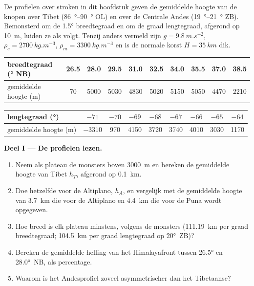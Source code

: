 \begin{problem}\label{pb:b2:himalaya-andes:1}
De profielen over stroken in dit hoofdstuk geven de gemiddelde hoogte van de knopen over Tibet
(\qtyrange{86}{90}{\degree} OL) en over de Centrale Andes (\qtyrange{19}{21}{\degree} ZB).
Bemonsterd om de \ang{1.5} breedtegraad en om de graad lengtegraad, afgerond op \qty{10}{m}, luiden ze
als volgt. Tenzij anders vermeld zijn $g = \qty{9.8}{m.s^{-2}}$, $\rho_c = \qty{2700}{kg.m^{-3}}$,
$\rho_m = \qty{3300}{kg.m^{-3}}$ en is de normale korst $H = \qty{35}{km}$ dik.

\smallskip
\begin{center}\small
\begin{tabular}{l|ccccccccc}
breedtegraad (\unit{\degree} NB) & 26.5 & 28.0 & 29.5 & 31.0 & 32.5 & 34.0 & 35.5 & 37.0 & 38.5 \\ \hline
gemiddelde hoogte (\unit{m}) & 70 & 5000 & 5030 & 4830 & 5020 & 5150 & 5050 & 4470 & 2210
\end{tabular}

\smallskip
\begin{tabular}{l|cccccccc}
lengtegraad (\unit{\degree}) & $-71$ & $-70$ & $-69$ & $-68$ & $-67$ & $-66$ & $-65$ & $-64$ \\ \hline
gemiddelde hoogte (\unit{m}) & $-3310$ & 970 & 4150 & 3720 & 3740 & 4010 & 3030 & 1170
\end{tabular}
\end{center}
\smallskip

\noindent\textbf{Deel I --- De profielen lezen.}
\begin{enumerate}
\item Neem als plateau de monsters boven \qty{3000}{m} en bereken de gemiddelde hoogte van Tibet
$h_T$, afgerond op \qty{0.1}{km}.
\item Doe hetzelfde voor de Altiplano, $h_A$, en vergelijk met de gemiddelde hoogte van
\qty{3.7}{km} die voor de Altiplano en \qty{4.4}{km} die voor de Puna wordt opgegeven.
\item Hoe breed is elk plateau minstens, volgens de monsters (\qty{111.19}{km} per
graad breedtegraad; \qty{104.5}{km} per graad lengtegraad op \ang{20}~ZB)?
\item Bereken de gemiddelde helling van het Himalayafront tussen \ang{26.5} en \ang{28.0}~NB, als
percentage.
\item Waarom is het Andesprofiel zoveel asymmetrischer dan het Tibetaanse?
\end{enumerate}


\end{problem}
